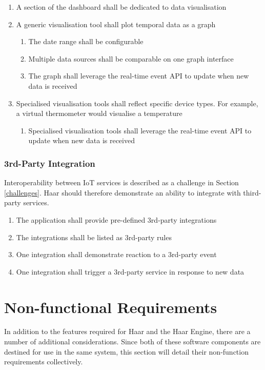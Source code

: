         \begin{enumerate}
          \item A section of the dashboard shall be dedicated to data visualisation
          \item A generic visualisation tool shall plot temporal data as a graph
          \begin{enumerate}
            \item The date range shall be configurable
            \item Multiple data sources shall be comparable on one graph interface
            \item The graph shall leverage the real-time event API to update when new data is received
          \end{enumerate}
          \item Specialised visualisation tools shall reflect specific device types. For example, a virtual thermometer would visualise a temperature
          \begin{enumerate}
            \item Specialised visualisation tools shall leverage the real-time event API to update when new data is received
          \end{enumerate}
        \end{enumerate}

      \subsubsection{3rd-Party Integration}
        Interoperability between IoT services is described as a challenge in Section \ref{challenges}. Haar should therefore demonstrate an ability to integrate with third-party services.

        \begin{enumerate}
          \item The application shall provide pre-defined 3rd-party integrations
          \item The integrations shall be listed as 3rd-party rules
          \item One integration shall demonstrate reaction to a 3rd-party event
          \item One integration shall trigger a 3rd-party service in response to new data
        \end{enumerate}  

  \section{Non-functional Requirements}
    In addition to the features required for Haar and the Haar Engine, there are a number of additional considerations. Since both of these software components are destined for use in the same system, this section will detail their non-function requirements collectively.

